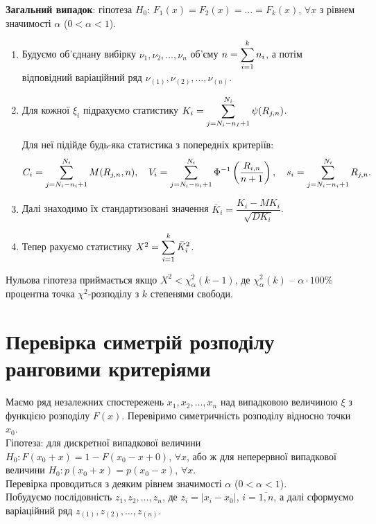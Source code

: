 \textbf{Загальний випадок}: гіпотеза $H_0$: $F_1(x) = F_2(x) = \ldots = F_k(x)$, $\forall x$ з рівнем значимості $\alpha$ ($0 < \alpha < 1$). 

\begin{enumerate}
    \item Будуємо об'єднану вибірку $\nu_1, \nu_2, \ldots, \nu_n$ об'єму $n = \displaystyle\sum\limits_{i=1}^k n_i$, а потім відповідний варіаційний ряд $\nu_{(1)}, \nu_{(2)}, \ldots, \nu_{(n)}$.
    
    \item Для кожної $\xi_i$ підрахуємо статистику $K_i = \displaystyle\sum\limits_{j = N_i - n_I + 1}^{N_i} \psi(R_{j, n})$. 
    
    Для неї підійде будь-яка статистика з попередніх критеріїв:
    \[ C_i = \displaystyle\sum\limits_{j = N_i - n_i + 1}^{N_i} M(R_{j, n}, n), \quad V_i = \displaystyle\sum\limits_{j = N_i - n_i + 1}^{N_i} \Phi^{-1} \left( \dfrac{R_{i,n}}{n+1} \right), \quad s_i = \displaystyle\sum\limits_{j = N_i - n_i + 1}^{N_i} R_{j, n}. \]
    
    \item Далі знаходимо їх стандартизовані значення $\bar{K}_i = \dfrac{K_i - MK_i}{\sqrt{DK_i}}$.
    
    \item Тепер рахуємо статистику $X^2 = \displaystyle\sum\limits_{i=1}^k \bar{K}_i^2$. 
\end{enumerate}

Нульова гіпотеза приймається якщо $X^2 < \chi_\alpha^2(k-1)$, де $\chi_\alpha^2(k)$ -- $\alpha \cdot 100\%$ процентна точка $\chi^2$-розподілу з $k$ степенями свободи. 

\section{Перевірка симетрій розподілу ранговими критеріями}

Маємо ряд незалежних спостережень $x_1, x_2, \ldots, x_n$ над випадковою величиною $\xi$ з функцією розподілу $F(x)$. Перевіримо симетричність розподілу відносно точки $x_0$. \\

Гіпотеза: для дискретної випадкової величини $H_0: F(x_0 + x) = 1 - F(x_0 - x + 0)$, $\forall x$, або ж для неперервної випадкової величини $H_0: p(x_0 + x) = p(x_0 - x)$, $\forall x$. \\

Перевірка проводиться з деяким рівнем значимості $\alpha$ ($0 < \alpha < 1$). \\

Побудуємо послідовність $z_1, z_2, \ldots, z_n$, де $z_i = |x_i - x_0|$, $i = \overline{1, n}$, а далі сформуємо варіаційний ряд $z_{(1)}, z_{(2)}, \ldots, z_{(n)}$. \\

